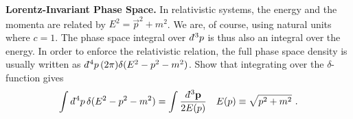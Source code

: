 \begin{exercise}\textbf{Lorentz-Invariant Phase Space.}
In relativistic systems, the energy and the momenta are related by $E^2 = \vec{p}^2 + m^2$. We are, of course, using natural units where $c=1$. The phase space integral over $\dbar^3p$ is thus also an integral over the energy. In order to enforce the relativistic relation, the full phase space density is usually written as $\dbar^4p\, (2\pi)\delta(E^2-p^2-m^2)$. Show that integrating over the $\delta$-function gives
\begin{align}
	\int \dbar^4p\, \delta(E^2-p^2-m^2) &= 
	\int \frac{\dbar^3\vec{p}}{2E(p)}
	&
	E(p) \equiv \sqrt{p^2 + m^2} \ .
\end{align}
\end{exercise}